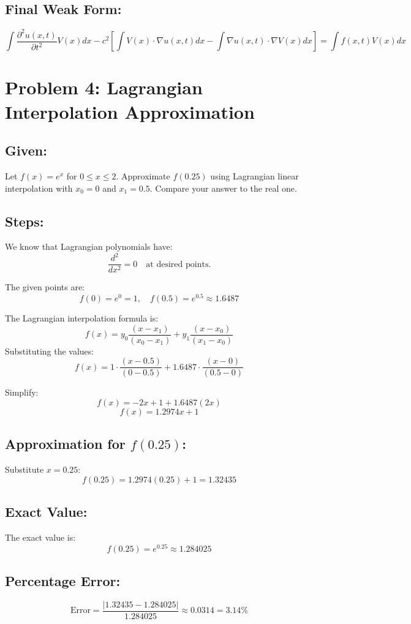 \documentclass[11pt]{article}
\begin{document}
\subsection*{Final Weak Form:}
\[
\boxed{\int \frac{\partial^2 u(x, t)}{\partial t^2} V(x) dx - c^2 \left[ \int V(x) \cdot \nabla u(x, t) dx - \int \nabla u(x, t) \cdot \nabla V(x) dx \right] = \int f(x, t) V(x) dx}
\]

\section*{Problem 4: Lagrangian Interpolation Approximation}

\subsection*{Given:}
Let \(f(x) = e^x\) for \(0 \leq x \leq 2\). Approximate \(f(0.25)\) using Lagrangian linear interpolation with \(x_0 = 0\) and \(x_1 = 0.5\). Compare your answer to the real one.

\subsection*{Steps:}
We know that Lagrangian polynomials have:
\[
\frac{d^2}{dx^2} = 0 \quad \text{at desired points.}
\]

The given points are:
\[
f(0) = e^0 = 1, \quad f(0.5) = e^{0.5} \approx 1.6487
\]

The Lagrangian interpolation formula is:
\[
f(x) = y_0 \frac{(x - x_1)}{(x_0 - x_1)} + y_1 \frac{(x - x_0)}{(x_1 - x_0)}
\]
Substituting the values:
\[
f(x) = 1 \cdot \frac{(x - 0.5)}{(0 - 0.5)} + 1.6487 \cdot \frac{(x - 0)}{(0.5 - 0)}
\]

Simplify:
\[
f(x) = -2x + 1 + 1.6487(2x)
\]
\[
f(x) = 1.2974x + 1
\]

\subsection*{Approximation for \(f(0.25)\):}
Substitute \(x = 0.25\):
\[
f(0.25) = 1.2974(0.25) + 1 = 1.32435
\]

\subsection*{Exact Value:}
The exact value is:
\[
f(0.25) = e^{0.25} \approx 1.284025
\]

\subsection*{Percentage Error:}
\[
\text{Error} = \frac{|1.32435 - 1.284025|}{1.284025} \approx 0.0314 = 3.14\%
\]
\end{document}
